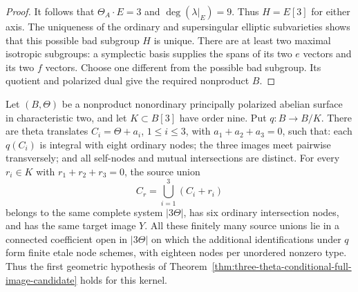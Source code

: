 \begin{proof}
It follows that $\Theta_A\cdot E=3$ and
$\deg(\lambda|_E)=9$. Thus $H=E[3]$ for either axis.
The uniqueness of the ordinary and supersingular elliptic
subvarieties shows that this possible bad subgroup $H$ is unique.
There are at least two maximal isotropic subgroups: a symplectic
basis supplies the spans of its two $e$ vectors and its two $f$
vectors. Choose one different from the possible bad subgroup.
Its quotient and polarized dual give the required nonproduct $B$.
\end{proof}

\begin{lemma}
\label{lem:root-nonordinary-three-theta-clean-boundary-candidate}
Let $(B,\Theta)$ be a nonproduct nonordinary principally polarized
abelian surface in characteristic two, and let $K\subset B[3]$
have order nine. Put $q:B\to B/K$. There are theta translates
$C_i=\Theta+a_i$, $1\le i\le3$, with $a_1+a_2+a_3=0$, such that:
each $q(C_i)$ is integral with eight ordinary nodes; the three
images meet pairwise transversely; and all self-nodes and mutual
intersections are distinct. For every $r_i\in K$ with
$r_1+r_2+r_3=0$, the source union
\[
                       C_r=\bigcup_{i=1}^3(C_i+r_i)
\]
belongs to the same complete system $|3\Theta|$, has six ordinary
intersection nodes, and has the same target image $Y$.
All these finitely many source unions lie in a connected coefficient
open in $|3\Theta|$ on which the additional identifications under
$q$ form finite etale node schemes, with eighteen nodes per
unordered nonzero type. Thus the first geometric hypothesis of
Theorem~\ref{thm:three-theta-conditional-full-image-candidate}
holds for this kernel.
\end{lemma}
